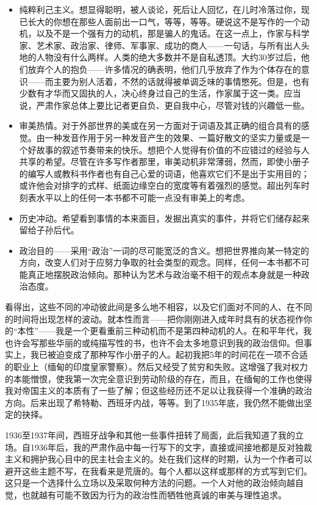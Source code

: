 \documentclass[fontset=fandol,12pt,a5paper]{ctexbook}
\begin{document}
\begin{itemize}
	\item 纯粹利己主义。想显得聪明，被人谈论，死后让人回忆，在儿时冷落过你，现已长大的你想在那些人面前出一口气，等等，等等。硬说这不是写作的一个动机，以及不是一个强有力的动机，那是骗人的鬼话。在这一点上，作家与科学家、艺术家、政治家、律师、军事家、成功的商人——一句话，与所有出人头地的人物没有什么两样。人类的绝大多数并不是自私透顶。大约30岁过后，他们放弃个人的抱负——许多情况的确表明，他们几乎放弃了作为个体存在的意识——而主要为别人活着，不然的话就得被单调乏味的事情憋死。但是，也有少数有才华而又固执的人，决心终身过自己的生活，作家属于这一类。应当说，严肃作家总体上要比记者更自负、更自我中心，尽管对钱的兴趣低一些。
	\item 审美热情。对于外部世界的美或在另一方面对于词语及其正确的组合具有的感觉。由一种发音作用于另一种发音产生的效果、一篇好散文的坚实力量或是一个好故事的叙述节奏带来的快乐。想把个人觉得有价值的不应错过的经验与人共享的希望。尽管在许多写作者那里，审美动机非常薄弱，然而，即使小册子的编写人或教科书作者也有自己心爱的词语，他喜欢它们不是出于实用目的；或许他会对排字的式样、纸面边缘空白的宽度等有着强烈的感觉。超出列车时刻表水平以上的任何一本书都不可能一点没有审美上的考虑。
	\item 历史冲动。希望看到事情的本来面目，发掘出真实的事件，并将它们储存起来留给子孙后代。
	\item 政治目的——采用“政治”一词的尽可能宽泛的含义。想把世界推向某一特定的方向，改变人们对于应努力争取的社会类型的观念。同样，任何一本书都不可能真正地摆脱政治倾向。那种认为艺术与政治毫不相干的观点本身就是一种政治态度。
\end{itemize}

看得出，这些不同的冲动彼此间是多么地不相容，以及它们面对不同的人、在不同的时间将出现怎样的波动。就本性而言——把你刚刚进入成年时具有的状态视作你的“本性”——我是一个更看重前三种动机而不是第四种动机的人。在和平年代，我也许会写那些华丽的或纯描写性的书，也许不会太多地意识到我的政治信仰。但事实上，我已被迫变成了那种写作小册子的人。起初我把5年的时间花在一项不合适的职业上（缅甸的印度皇家警察）。然后又经受了贫穷和失败。这增强了我对权力的本能憎恨，使我第一次完全意识到劳动阶级的存在，而且，在缅甸的工作也使得我对帝国主义的本质有了一些了解；但这些经历还不足以让我获得一个准确的政治方向。后来出现了希特勒、西班牙内战，等等。到了1935年底，我仍然不能做出坚定的抉择。

1936至1937年间，西班牙战争和其他一些事件扭转了局面，此后我知道了我的立场。自1936年后，我的严肃作品中每一行写下的文字，直接或间接地都是反对独裁主义和拥护我心目中的民主社会主义的。处在我们这样的时期，认为一个作者可以避开这些主题不写，在我看来是荒唐的。每个人都以这样或那样的方式写到它们。这只是一个选择什么立场以及采取何种方法的问题。一个人对他的政治倾向越自觉，也就越有可能不致因为行为的政治性而牺牲他真诚的审美与理性追求。
\end{document}
